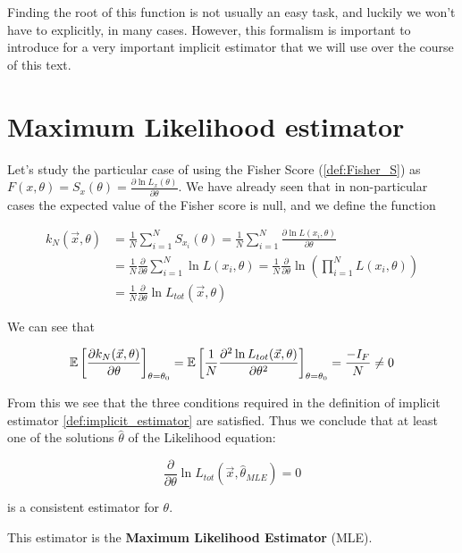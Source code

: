 Finding the root of this function is not usually an easy task, and luckily we won't have to explicitly, in many cases. However, this formalism is important to introduce for a very important implicit estimator that we will use over the course of this text.

\section{Maximum Likelihood estimator}

Let's study the particular case of using the Fisher Score (\ref{def:Fisher_S}) as $F(x,\theta) = S_x(\theta) = \frac{\partial \ln L_x(\theta)}{\partial\theta}$. We have already seen that in non-particular cases the expected value of the Fisher score is null, and we define the function 

	\begin{align*}
		k_N(\vec{x},\theta) &= \frac{1}{N}\sum_{i=1}^N S_{x_i}(\theta) = \frac{1}{N}\sum_{i=1}^N \frac{\partial\ln L(x_i,\theta)}{\partial\theta} \\
		&= \frac{1}{N}\frac{\partial}{\partial\theta}\sum_{i=1}^N \ln L(x_i,\theta)=\frac{1}{N}\frac{\partial}{\partial\theta}\ln \left(\prod_{i=1}^{N}L(x_i,\theta)\right) \\
		&= \frac{1}{N}\frac{\partial}{\partial\theta}\ln L_{tot}(\vec{x},\theta)
	\end{align*}


We can see that
	
	\[
	\mathbb{E}\left[\frac{\partial k_N(\vec{x},\theta)}{\partial\theta}\right]_{\theta=\theta_0} = \mathbb{E}\left[\frac{1}{N}\frac{\partial^2\ln L_{tot}(\vec{x},\theta)}{\partial\theta^2}\right]_{\theta=\theta_0}= \frac{-I_F}{N} \neq 0
	\]

From this we see that the three conditions required in the definition of implicit estimator \ref{def:implicit_estimator} are satisfied. Thus we conclude that at least one of the solutions $\hat\theta$ of the Likelihood equation:

\begin{equation}
	\frac{\partial}{\partial\theta} \ln L_{tot}(\vec{x},\hat\theta_{MLE}) = 0 
	\tag{Likelihood equation}
	\label{eq:likelihood}
\end{equation}

is a consistent estimator for $\theta$. 

This estimator is the \textbf{Maximum Likelihood Estimator} (MLE).

